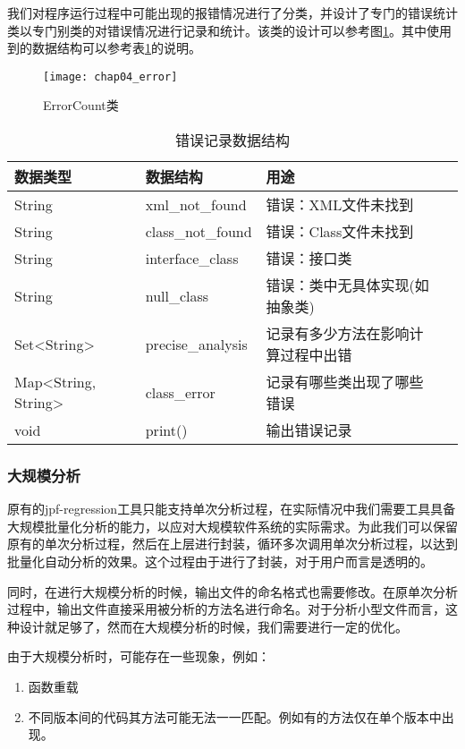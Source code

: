 我们对程序运行过程中可能出现的报错情况进行了分类，并设计了专门的错误统计类以专门别类的对错误情况进行记录和统计。该类的设计可以参考图\ref {class_error}。其中使用到的数据结构可以参考表\ref {error_data}的说明。

\begin{figure}[H]
	\centering
	\texttt{[image: chap04\_error]}
	\caption {ErrorCount类}
	\label {class_error}	
\end{figure}

\begin{table}
	\caption{错误记录数据结构}
	\label{error_data}
	\centering
	\begin{tabular}{lllc}
		\toprule[1.5pt]
		{\heiti 数据类型} &{\heiti 数据结构} & {\heiti 用途} \\\midrule[1pt]
		String & xml\_not\_found & 错误：XML文件未找到 \\
		String & class\_not\_found & 错误：Class文件未找到 \\
		String & interface\_class &  错误：接口类\\
		String & null\_class & 错误：类中无具体实现(如抽象类)\\
		Set<String> & precise\_analysis & 记录有多少方法在影响计算过程中出错\\
		Map<String, String> & class\_error & 记录有哪些类出现了哪些错误\\
		void & print() & 输出错误记录\\
		\bottomrule[1.5pt]
	\end{tabular}
\end{table}


\subsubsection{大规模分析}

原有的jpf-regression工具只能支持单次分析过程，在实际情况中我们需要工具具备大规模批量化分析的能力，以应对大规模软件系统的实际需求。为此我们可以保留原有的单次分析过程，然后在上层进行封装，循环多次调用单次分析过程，以达到批量化自动分析的效果。这个过程由于进行了封装，对于用户而言是透明的。

同时，在进行大规模分析的时候，输出文件的命名格式也需要修改。在原单次分析过程中，输出文件直接采用被分析的方法名进行命名。对于分析小型文件而言，这种设计就足够了，然而在大规模分析的时候，我们需要进行一定的优化。

由于大规模分析时，可能存在一些现象，例如：
\begin{enumerate}
	\item 函数重载
	\item 不同版本间的代码其方法可能无法一一匹配。例如有的方法仅在单个版本中出现。
\end{enumerate}

